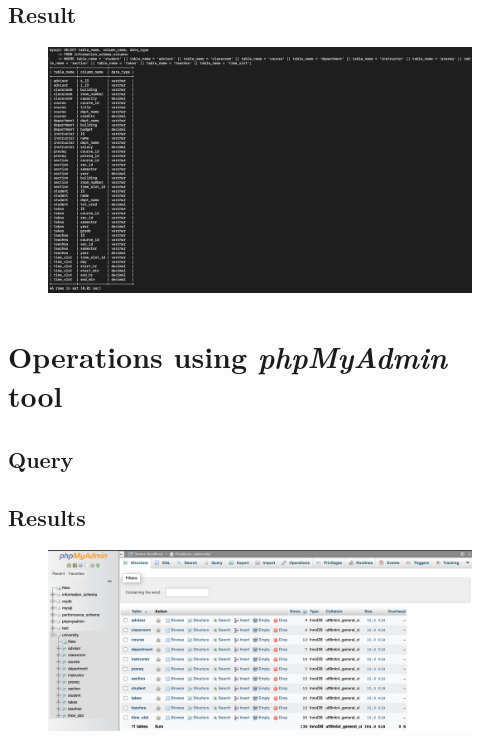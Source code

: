 \documentclass[12pt]{article}
\begin{document}
\subsection{Result}
\begin{figure}[!hbt]
    \centering
    \includegraphics[scale=0.35]{screenshots/6.png}
    \label{fig:my_label1}
\end{figure}
\newpage


\section{Operations using \textit{phpMyAdmin} tool}

\subsection{Query}
\newpage

\subsection{Results}

\begin{figure}[!hbt]
    \centering
    \includegraphics[scale=0.33]{screenshots/7 1.png}
    \label{fig:my_label1}
\end{figure}
\end{document}

